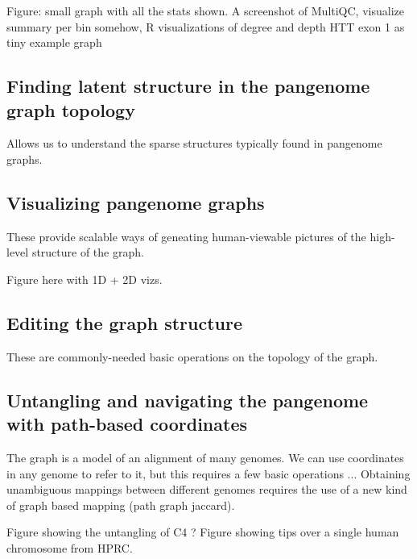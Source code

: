 \documentclass{bioinfo}
\begin{document}
Figure: small graph with all the stats shown. A screenshot of MultiQC, visualize summary per bin somehow, R visualizations of degree and depth HTT exon 1 as tiny example graph

\subsection{Finding latent structure in the pangenome graph topology}


Allows us to understand the sparse structures typically found in pangenome graphs.

\subsection{Visualizing pangenome graphs}


These provide scalable ways of geneating human-viewable pictures of the high-level structure of the graph.

Figure here with 1D + 2D vizs.

\subsection{Editing the graph structure}


These are commonly-needed basic operations on the topology of the graph.

\subsection{Untangling and navigating the pangenome with path-based coordinates}


The graph is a model of an alignment of many genomes.
We can use coordinates in any genome to refer to it, but this requires a few basic operations ...
Obtaining unambiguous mappings between different genomes requires the use of a new kind of graph based mapping (path graph jaccard).

Figure showing the untangling of C4 ?
Figure showing tips over a single human chromosome from HPRC.
\end{document}
